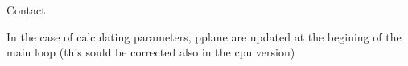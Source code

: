 
Contact 

In the case of calculating parameters, pplane are updated at the begining of the main loop (this sould be corrected also in the cpu version)

